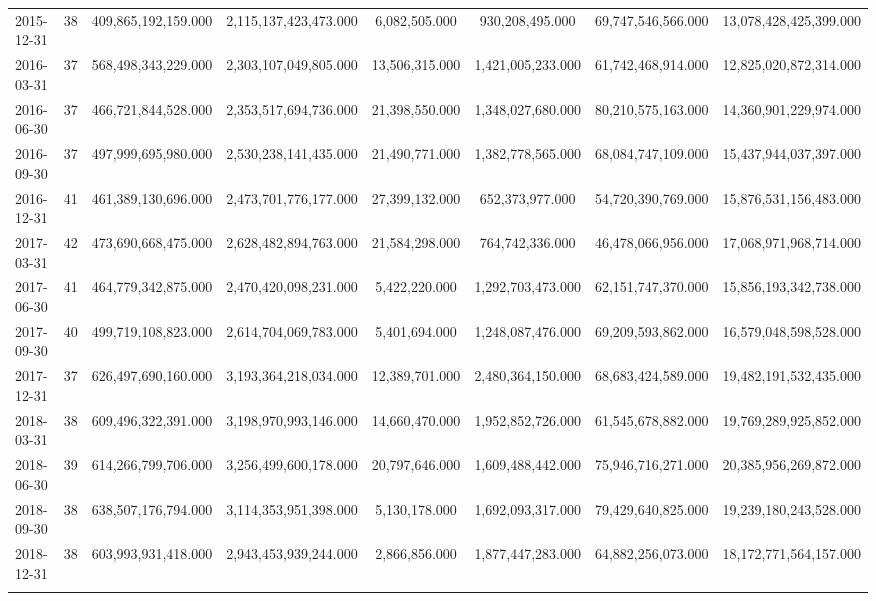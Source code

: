 \begin{table}[!htbp]
\begin{tabular}{@{\extracolsep{5pt}}lccccccc}
2015-12-31 & 38 & 409,865,192,159.000 & 2,115,137,423,473.000 & 6,082,505.000 & 930,208,495.000 & 69,747,546,566.000 & 13,078,428,425,399.000 \\ 
2016-03-31 & 37 & 568,498,343,229.000 & 2,303,107,049,805.000 & 13,506,315.000 & 1,421,005,233.000 & 61,742,468,914.000 & 12,825,020,872,314.000 \\ 
2016-06-30 & 37 & 466,721,844,528.000 & 2,353,517,694,736.000 & 21,398,550.000 & 1,348,027,680.000 & 80,210,575,163.000 & 14,360,901,229,974.000 \\ 
2016-09-30 & 37 & 497,999,695,980.000 & 2,530,238,141,435.000 & 21,490,771.000 & 1,382,778,565.000 & 68,084,747,109.000 & 15,437,944,037,397.000 \\ 
2016-12-31 & 41 & 461,389,130,696.000 & 2,473,701,776,177.000 & 27,399,132.000 & 652,373,977.000 & 54,720,390,769.000 & 15,876,531,156,483.000 \\ 
2017-03-31 & 42 & 473,690,668,475.000 & 2,628,482,894,763.000 & 21,584,298.000 & 764,742,336.000 & 46,478,066,956.000 & 17,068,971,968,714.000 \\ 
2017-06-30 & 41 & 464,779,342,875.000 & 2,470,420,098,231.000 & 5,422,220.000 & 1,292,703,473.000 & 62,151,747,370.000 & 15,856,193,342,738.000 \\ 
2017-09-30 & 40 & 499,719,108,823.000 & 2,614,704,069,783.000 & 5,401,694.000 & 1,248,087,476.000 & 69,209,593,862.000 & 16,579,048,598,528.000 \\ 
2017-12-31 & 37 & 626,497,690,160.000 & 3,193,364,218,034.000 & 12,389,701.000 & 2,480,364,150.000 & 68,683,424,589.000 & 19,482,191,532,435.000 \\ 
2018-03-31 & 38 & 609,496,322,391.000 & 3,198,970,993,146.000 & 14,660,470.000 & 1,952,852,726.000 & 61,545,678,882.000 & 19,769,289,925,852.000 \\ 
2018-06-30 & 39 & 614,266,799,706.000 & 3,256,499,600,178.000 & 20,797,646.000 & 1,609,488,442.000 & 75,946,716,271.000 & 20,385,956,269,872.000 \\ 
2018-09-30 & 38 & 638,507,176,794.000 & 3,114,353,951,398.000 & 5,130,178.000 & 1,692,093,317.000 & 79,429,640,825.000 & 19,239,180,243,528.000 \\ 
2018-12-31 & 38 & 603,993,931,418.000 & 2,943,453,939,244.000 & 2,866,856.000 & 1,877,447,283.000 & 64,882,256,073.000 & 18,172,771,564,157.000 \\ 
\hline \\[-1.8ex] 
\end{tabular} 
\end{table} 